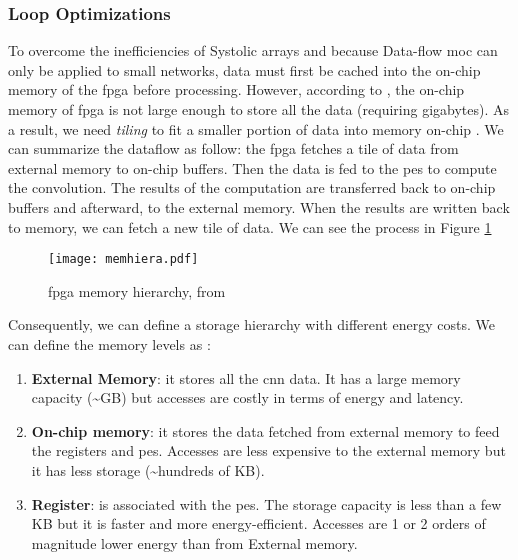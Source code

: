 \subsubsection{Loop Optimizations} \label{subsec:loopopti}
%
%
To overcome the inefficiencies of Systolic arrays and because Data-flow \acrshort{moc} can only be applied to small networks, data must first be cached into the on-chip memory of the \acrshort{fpga} before processing. However, according to \textcite{ma_optimizing_2018}, the on-chip memory of \acrshort{fpga} is not large enough to store all the data (requiring gigabytes). As a result, we need \textit{tiling} to fit a smaller portion of data into memory on-chip \cite{zhang_optimizing_2015}. We can summarize the dataflow as follow: the \acrshort{fpga} fetches a tile of data from external memory to on-chip buffers. Then the data is fed to the \acrshort{pe}s to compute the convolution. The results of the computation are transferred back to on-chip buffers and afterward, to the external memory. When the results are written back to memory, we can fetch a new tile of data. We can see the process in Figure \ref{fig:hierarchy}
%
\begin{figure}[H]
    \centering
    \texttt{[image: memhiera.pdf]}
    \caption{\acrshort{fpga} memory hierarchy, from \cite{ma_optimizing_2018}}
    \label{fig:hierarchy}
\end{figure}

Consequently, we can define a storage hierarchy with different energy costs. We can define the memory levels as \cite{sze_efficient_2017, horowitz_11_2014}:
%
\begin{enumerate}
    \item \textbf{External Memory}: it stores all the \acrshort{cnn} data. It has a large memory capacity (\textasciitilde GB) but accesses are costly in terms of energy and latency.
    \item \textbf{On-chip memory}: it stores the data fetched from external memory to feed the registers and \acrshort{pe}s. Accesses are less expensive to the external memory but it has less storage (\textasciitilde hundreds of KB).
    \item \textbf{Register}: is associated with the \acrshort{pe}s. The storage capacity is less than a few KB but it is faster and more energy-efficient. Accesses are 1 or 2 orders of magnitude lower energy than from External memory.
\end{enumerate}

